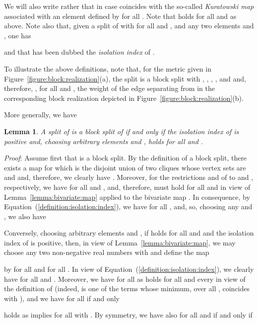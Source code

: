 \documentclass[12pt]{article}
\newtheorem{lemma}[prop]{Lemma}
\begin{document}
We will also write  rather that  in case  coincides with the so-called \emph{Kuratowski map}  
\cite{kuratowski:non:separable:metric:spaces:1935} associated with an element  defined by  for all .
Note that  holds for all  and  as above. Note also that, given a split  of  
with  for all  and , and any two elements  and , one has    

and that  has been dubbed the
\emph{isolation index} of  \cite{bandelt:dress:canonical:1992}. 

To illustrate the above definitions, 
note that, 
for the metric given in Figure~\ref{figure:block:realization}(a),
the split  is a block split with 
, , , , and  and, therefore, 
, for all  and , 
the weight of the edge  separating  from  in the corresponding block realization depicted
in Figure~\ref{figure:block:realization}(b).


More generally, we have

\begin{lemma}
\label{lemma:characterization:block:splits}
A split  of  
is a block split of  if and only 
if the isolation index  of  is positive and, choosing
arbitrary elements  and ,
 holds for all  and .
\end{lemma}

\noindent\textsl{Proof}:
Assume first that  is a block split. By the definition of a block split, 
there exists a map  for which
 is the disjoint union of two cliques whose
vertex sets are  and  and, therefore, we clearly have 
. Moreover, for the restrictions  and 
 of  to  and , respectively, we have 
 for all  and , and,
therefore,  must hold for all  and
 in view of Lemma~\ref{lemma:bivariate:map} applied to the bivariate
map .
In consequence, by Equation~(\ref{definition:isolation:index}),
we have  for all ,  and,
so, choosing any   and , we also have


Conversely, choosing arbitrary elements  and ,
if  holds for all  and  and the isolation index of  is positive,
then, in view of Lemma~\ref{lemma:bivariate:map},  
we may choose any two non-negative real numbers  with  and 
define the map 
 
by  for all  and 
 for all 
. In view of Equation~(\ref{definition:isolation:index}), we clearly have
 for all  
 and .
Moreover, we have  for all  
  as
 holds for all  
  and every  in view of the definition of  \big(indeed,  is one of the terms whose minimum, over all , coincides with \big), and we have   for all  
  if and only 
 
 holds as   implies  for all  with . By symmetry, we have also  for all  
  and  if and only if
 
\end{document}
